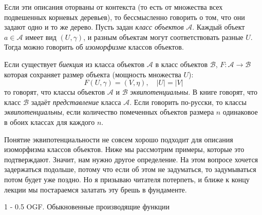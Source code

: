 \documentclass{article}
\makeatletter
\theoremstyle{definition}
\renewcommand{\section}{\@startsection
{section}%
{1}%
{\z@}%
{-\baselineskip}%
{0.5\baselineskip}%
{\centering\large\scshape}} %
\makeatother
\begin{document}
Если эти описания оторваны от контекста (то есть от множества всех подвешенных 
корневых деревьев), то бессмысленно говорить о том, что они задают одно и то же 
дерево. Пусть задан \textit{класс объектов} \( \mathcal A \). Каждый объект \( 
a \in \mathcal A \) имеет вид \( (U, \gamma) \), и разным объектам могут 
соответствовать разные \( U \). Тогда можно говорить об \textit{изоморфизме} 
классов объектов.

Если существует \textit{биекция} из класса объектов \( \mathcal A \) в класс 
объектов \( \mathcal B \), \( F \colon \mathcal A \to \mathcal B \) которая 
сохраняет размер объекта (мощность множества \( U \)):
\[
	F(U, \gamma) = (V, \eta), \quad |U| = |V|
\]
то говорят, что классы объектов \( \mathcal A \) и \( \mathcal B \) 
\textit{эквипотенциальны}. 
В книге \cite{gouldenjackson} говорят, что класс \( \mathcal B \) задаёт 
\textit{представление} класса \( \mathcal A \). Если говорить по-русски, то 
классы \textit{эквипотенциальны}, если количество помеченных объектов размера 
\( n \) одинаковое в обоих классах для каждого \( n \).

Понятие эквипотенциальности не совсем хорошо подходит для описания изоморфизма 
классов объектов. Ниже мы рассмотрим примеры, которые это подтверждают. Значит, 
нам нужно другое определение.
На этом вопросе хочется задержаться подольше, потому что если об этом не 
задуматься, то задумываться потом будет уже поздно. Но я призываю читателя 
потерпеть, и ближе к концу лекции мы постараемся залатать эту брешь в 
фундаменте.

\section{OGF. Обыкновенные производящие функции}
\end{document}
